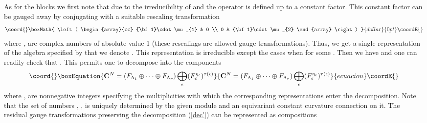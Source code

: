 \documentclass[a4paper,a4paper]{article}
\begin{document}
{As for the blocks \coordHE{} we first note that due to the irreducibility of \coordHE{} and 
\coordHE{} the operator \coordHE{}  is defined up to a  constant factor. 
This constant factor can be gauged away by conjugating \coordHE{} with a suitable rescaling transformation 
$$\coord{}\boxMath{
 \left(
\begin{array}{cc} {\bf 1}\cdot \mu_{1} & 0 \\ 
 0 &  {\bf 1}\cdot \mu_{2} \end{array} \right) 
}{dollar}{0pt}\coordE{}$$
where \coordHE{}, \coordHE{} are complex numbers of absolute value 1 (these rescalings are allowed gauge transformations).
Thus,  
we get a single representation of  the algebra specified by \coordHE{}  that we denote \coordHE{}. 
This representation is irreducible except the cases when  \coordHE{} for some \myHighlight{$\epsilon$}\coordHE{}. 
Then  
we have \coordHE{} and  one can readily check that 
\coordHE{}. 
This permits one to decompose \coordHE{} into the components 
\begin{equation}\coord{}\boxEquation{ \label{dec'}
{\bf C}^{N} = \left( F_{\Lambda_{1}}\oplus \dots \oplus F_{\Lambda_{r} } \right) 
\bigoplus_{\epsilon} (F_{\epsilon}^{\eta_{\epsilon}})^{\tau(\epsilon)} 
}{ {\bf C}^{N} = \left( F_{\Lambda_{1}}\oplus \dots \oplus F_{\Lambda_{r} } \right) 
\bigoplus_{\epsilon} (F_{\epsilon}^{\eta_{\epsilon}})^{\tau(\epsilon)} 
}{ecuacion}\coordE{}\end{equation}
where \myHighlight{$\eta_{\epsilon}=\pm $}\coordHE{}, \myHighlight{$\tau(\epsilon)$}\coordHE{} are nonnegative integers specifying the multiplicities with which 
the corresponding representations enter the decomposition. 
Note that the set of numbers \coordHE{}, \coordHE{}, \myHighlight{$\tau(\epsilon)$}\coordHE{} is  uniquely determined by the given 
\coordHE{} module \coordHE{} and an equivariant constant curvature connection \coordHE{} on it. 
The residual gauge transformations preserving the decomposition (\ref{dec'}) can be represented as  compositions 
}
\end{document}
